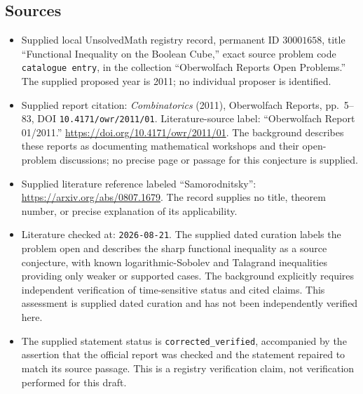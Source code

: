 \documentclass[11pt]{article}
\begin{document}
\subsection{Sources}
\begin{itemize}
\item Supplied local UnsolvedMath registry record, permanent ID \(30001658\), title ``Functional Inequality on the Boolean Cube,'' exact source problem code \texttt{catalogue entry}, in the collection ``Oberwolfach Reports Open Problems.'' The supplied proposed year is 2011; no individual proposer is identified.
\item Supplied report citation: \emph{Combinatorics} (2011), Oberwolfach Reports, pp.\ 5--83, DOI \texttt{10.4171/owr/2011/01}. Literature-source label: ``Oberwolfach Report 01/2011.'' \url{https://doi.org/10.4171/owr/2011/01}. The background describes these reports as documenting mathematical workshops and their open-problem discussions; no precise page or passage for this conjecture is supplied.
\item Supplied literature reference labeled ``Samorodnitsky'': \url{https://arxiv.org/abs/0807.1679}. The record supplies no title, theorem number, or precise explanation of its applicability.
\item Literature checked at: \texttt{2026-08-21}. The supplied dated curation labels the problem open and describes the sharp functional inequality as a source conjecture, with known logarithmic-Sobolev and Talagrand inequalities providing only weaker or supported cases. The background explicitly requires independent verification of time-sensitive status and cited claims. This assessment is supplied dated curation and has not been independently verified here.
\item The supplied statement status is \texttt{corrected\_verified}, accompanied by the assertion that the official report was checked and the statement repaired to match its source passage. This is a registry verification claim, not verification performed for this draft.
\end{itemize}
\end{document}

